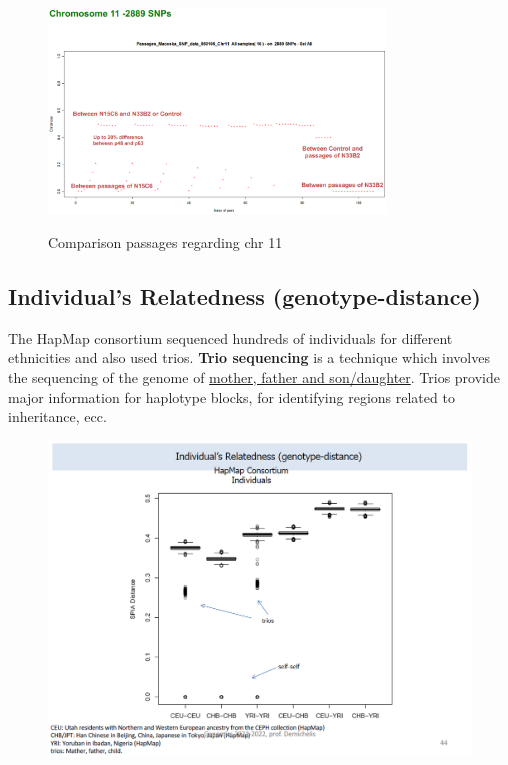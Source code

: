 \begin{figure}[ht]
	\caption{Comparison passages regarding chr 11}
	\centering
	\includegraphics[width=0.8\textwidth]{chr11chip.PNG}
	\label{fig: chr 11 SNPs}
  \end{figure}


\subsection{Individual's Relatedness (genotype-distance)}

The HapMap consortium sequenced hundreds of individuals for different
ethnicities and also used trios. \textbf{Trio sequencing} is a technique which
involves the sequencing of the genome of \underline{mother, father and
son/daughter}. Trios provide major information for haplotype blocks, for
identifying regions related to inheritance, ecc.

\begin{figure}[ht]
	\centering
	\includegraphics[width = 1\textwidth]{trios.PNG}
	\caption{\label{fig: trios}}
\end{figure}

